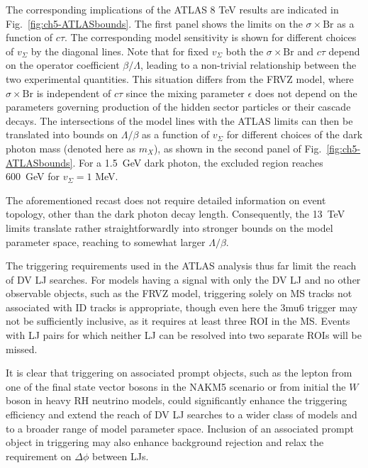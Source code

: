 The corresponding implications of the ATLAS 8 TeV results are indicated in Fig.~\ref{fig:ch5-ATLASbounds}. The first panel shows the limits on the $\sigma\times\mathrm{Br}$ as a function of $c\tau$. The corresponding model sensitivity is shown for different choices of $v_\Sigma$ by the diagonal lines. Note that for fixed $v_\Sigma$ both the $\sigma\times\mathrm{Br}$ and $c\tau$ depend on the operator coefficient $\beta/\Lambda$, leading to a non-trivial relationship between the two experimental quantities. This situation differs from the FRVZ model, where $\sigma\times\mathrm{Br}$ is independent of $c\tau$ since the mixing parameter $\epsilon$ does not depend on the parameters governing production of the hidden sector particles or their cascade decays. The intersections of the model lines with the ATLAS limits can then be translated into bounds on $\Lambda/\beta$ as a function of $v_\Sigma$ for different choices of the dark photon mass (denoted here as $m_X$), as shown in the second panel of Fig.~\ref{fig:ch5-ATLASbounds}. For a 1.5~GeV dark photon, the excluded region reaches \mbox{600~GeV} for $v_\Sigma = 1 $ MeV.

The aforementioned recast does not require detailed information on event topology, other than the dark photon decay length. Consequently, the 13~TeV limits  \cite{ATLAS:2016jza} translate rather straightforwardly into stronger bounds on the model parameter space, reaching to somewhat larger $\Lambda/\beta$. 

\vskip 0.1in
\vskip 0.1in

The triggering requirements used in the ATLAS analysis thus far limit the reach of DV LJ searches. For models having a signal with only the DV LJ and no other observable objects, such as the FRVZ model, triggering solely on MS tracks not associated with ID tracks is appropriate, though even here the 3mu6 trigger may not be sufficiently inclusive, as it requires at least three ROI in the MS. Events with LJ pairs for which neither LJ can be resolved into two separate ROIs will be missed. 

It is clear that triggering on associated prompt objects, such as the lepton from one of the final state vector bosons in the NAKM5 scenario or from initial the $W$ boson in heavy RH neutrino models, could significantly enhance the triggering efficiency and extend the reach of DV LJ searches to a wider class of models and to a broader range of model parameter space. Inclusion of an associated prompt object in triggering may also enhance background rejection and relax the requirement on $\Delta\phi$ between LJs.

